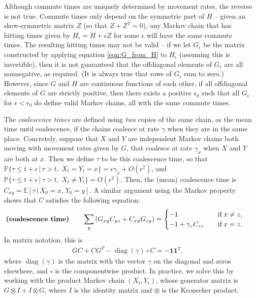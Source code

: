 \documentclass{article}
\DeclareMathOperator{\diag}{\mathop{\mbox{diag}}}
\renewcommand{\P}{\mathbb{P}}
\newcommand{\E}{\mathbb{E}}
\newcommand{\given}{\,\vert\,}
\newcommand{\bone}{\mathbf{1}}
\begin{document}
Although commute times are uniquely determined by movement rates, the reverse is not true.
Commute times only depend on the symmetric part of $H$ --
given an skew-symmetric matrix $Z$ (so that $Z + Z^T = 0$),
any Markov chain that has hitting times given by $H_\epsilon = H + \epsilon Z$ for some $\epsilon$
will have the same commute times.
The resulting hitting times may not be valid --
if we let $G_\epsilon$ be the matrix constructed by applying equation \eqref{eqn:G_from_H} to $H_\epsilon$
(assuming this is invertible),
then it is not guaranteed that the offdiagonal elements of $G_\epsilon$ are all nonnegative, as required.
(It is always true that rows of $G_\epsilon$ sum to zero.)
However, since $G$ and $H$ are continuous functions of each other,
if all offdiagonal elements of $G$ are strictly positive,
then there exists a positive $\epsilon_0$ such that all $G_\epsilon$ for $\epsilon < \epsilon_0$
do define valid Markov chains, all with the same commute times.

The \emph{coalescence times} are defined using \emph{two} copies of the same chain,
as the mean time until coalescence,
if the chains coalesce at rate $\gamma$ when they are in the same place.
Concretely, 
suppose that $X$ and $Y$ are independent Markov chains both moving with movement rates given by $G$,
that coalesce at rate $\gamma_x$ when $X$ and $Y$ are both at $x$.
Then we define $\tau$ to be this coalescence time,
so that 
$\P\{\tau \le t + \epsilon \given \tau > t, \; X_t = Y_t = x\} = \epsilon \gamma_x + O(\epsilon^2)$,
and 
$\P\{\tau \le t + \epsilon \given \tau > t, \; X_t \neq Y_t\} = O(\epsilon^2)$.
Then, the (mean) coalescence time is $C_{xy} = \E[\tau \given X_0 = x, \, Y_0 = y]$.
A similar argument using the Markov property
shows that $C$ satisfies the following equation:
\begin{align}
\text{\bf (coalescence time)} \qquad
    \sum_y \left(G_{xy} C_{yz} + C_{xy} G_{zy}\right)
    &=
    \begin{cases}
        -1                   \quad & \text{if} \; x \neq z, \\
        -1 + \gamma_z C_{zz} \quad & \text{if} \; x = z.
    \end{cases}
\end{align}
In matrix notation, this is
\begin{align} \label{eqn:C_matrix}
    G C + C G^T - \diag(\gamma) \circ C = -\bone \bone^T,
\end{align}
where $\diag(\gamma)$ is the matrix with the vector $\gamma$ on the diagonal and zeros elsewhere,
and $\circ$ is the componentwise product.
In practice, we solve this by working with the product Markov chain $(X_t, Y_t)$,
whose generator matrix is $G \otimes I + I \otimes G$,
where $I$ is the identity matrix and $\otimes$ is the Kronecker product.
\end{document}
